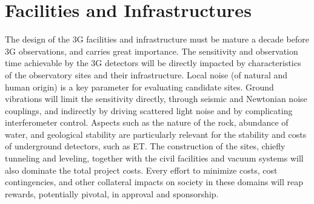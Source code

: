\chapter{Facilities and Infrastructures}
\label{sec:Fac_Inf}
The design of the 3G facilities and infrastructure must be mature a decade before 3G observations, and carries great importance. The sensitivity and observation time achievable by the 3G detectors will be directly impacted by characteristics of the observatory sites and their infrastructure. Local noise (of natural and human origin) is a key parameter for evaluating candidate sites. Ground vibrations will limit the sensitivity directly, through seismic and Newtonian noise couplings, and indirectly by driving scattered light noise and by complicating interferometer control. Aspects such as the nature of the rock, abundance of water, and geological stability are particularly relevant for the stability and costs of underground detectors, such as ET. The construction of the sites, chiefly tunneling and leveling, together with the civil facilities and vacuum systems will also dominate the total project costs. Every effort to minimize costs, cost contingencies, and other collateral impacts on society in these domains will reap rewards, potentially pivotal, in approval and sponsorship.

% 

